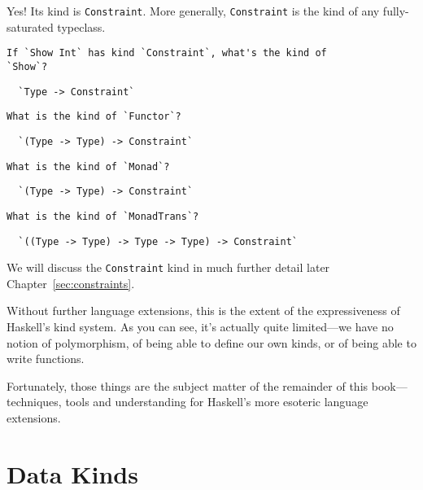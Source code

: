 \documentclass[
  11pt,
]{book}
\theoremstyle{nonumberplain}
\begin{document}
Yes! Its kind is \texttt{Constraint}. More generally,
\texttt{Constraint} is the kind of any fully-saturated typeclass.

\begin{verbatim}
If `Show Int` has kind `Constraint`, what's the kind of
`Show`?
\end{verbatim}

\begin{verbatim}
  `Type -> Constraint`
\end{verbatim}

\begin{verbatim}
What is the kind of `Functor`?
\end{verbatim}

\begin{verbatim}
  `(Type -> Type) -> Constraint`
\end{verbatim}

\begin{verbatim}
What is the kind of `Monad`?
\end{verbatim}

\begin{verbatim}
  `(Type -> Type) -> Constraint`
\end{verbatim}

\begin{verbatim}
What is the kind of `MonadTrans`?
\end{verbatim}

\begin{verbatim}
  `((Type -> Type) -> Type -> Type) -> Constraint`
\end{verbatim}

We will discuss the \texttt{Constraint} kind in much further detail
later Chapter~\ref{sec:constraints}.

Without further language extensions, this is the extent of the
expressiveness of Haskell's kind system. As you can see, it's actually
quite limited---we have no notion of polymorphism, of being able to
define our own kinds, or of being able to write functions.

Fortunately, those things are the subject matter of the remainder of
this book---techniques, tools and understanding for Haskell's more
esoteric language extensions.

\hypertarget{data-kinds}{%
\section{Data Kinds}\label{data-kinds}}
\end{document}
